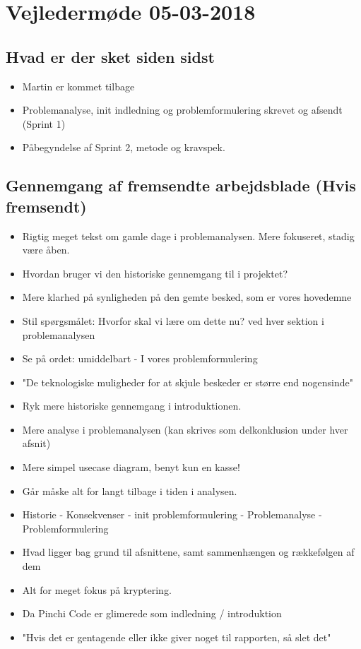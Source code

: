 \newpage
\section{Vejledermøde 05-03-2018}
\subsection{Hvad er der sket siden sidst}
    \begin{itemize}
        \item Martin er kommet tilbage
        \item Problemanalyse, init indledning og problemformulering skrevet og afsendt (Sprint 1)
        \item Påbegyndelse af Sprint 2, metode og kravspek.
    \end{itemize}
\subsection{Gennemgang af fremsendte arbejdsblade (Hvis fremsendt)}
    \begin{itemize}
        \item Rigtig meget tekst om gamle dage i problemanalysen. Mere fokuseret, stadig være åben.
        \item Hvordan bruger vi den historiske gennemgang til i projektet?
        \item Mere klarhed på synligheden på den gemte besked, som er vores hovedemne
        \item Stil spørgsmålet: Hvorfor skal vi lære om dette nu? ved hver sektion i problemanalysen
        \item Se på ordet: umiddelbart - I vores problemformulering
        \item "De teknologiske muligheder for at skjule beskeder er større end nogensinde"
        \item Ryk mere historiske gennemgang i introduktionen.
        \item Mere analyse i problemanalysen (kan skrives som delkonklusion under hver afsnit)
        \item Mere simpel usecase diagram, benyt kun en kasse!
        \item Går måske alt for langt tilbage i tiden i analysen.
        \item Historie - Konsekvenser - init problemformulering - Problemanalyse - Problemformulering
        \item Hvad ligger bag grund til afsnittene, samt sammenhængen og rækkefølgen af dem
        \item Alt for meget fokus på kryptering.
        \item Da Pinchi Code er glimerede som indledning / introduktion
        \item "Hvis det er gentagende eller ikke giver noget til rapporten, så slet det"
    \end{itemize}
